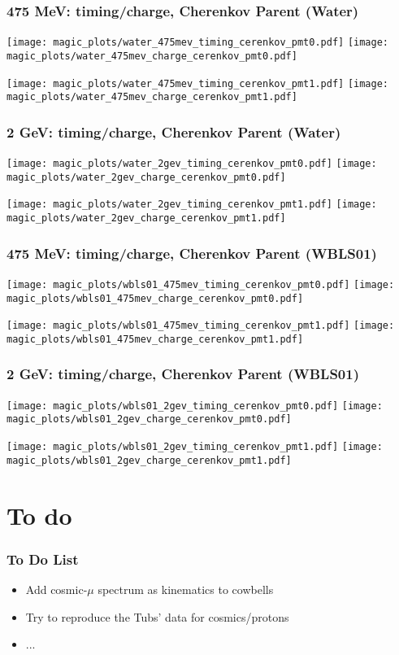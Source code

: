 \documentclass[xcolor=dvipsnames]{beamer}
\begin{document}
\begin{frame}[fragile]
  \frametitle{475 MeV: timing/charge, Cherenkov Parent (Water)}

\texttt{[image: magic\_plots/water\_475mev\_timing\_cerenkov\_pmt0.pdf]}%
\texttt{[image: magic\_plots/water\_475mev\_charge\_cerenkov\_pmt0.pdf]}%

\texttt{[image: magic\_plots/water\_475mev\_timing\_cerenkov\_pmt1.pdf]}%
\texttt{[image: magic\_plots/water\_475mev\_charge\_cerenkov\_pmt1.pdf]}%

\end{frame}
\begin{frame}[fragile]
  \frametitle{2 GeV: timing/charge, Cherenkov Parent (Water)}

\texttt{[image: magic\_plots/water\_2gev\_timing\_cerenkov\_pmt0.pdf]}%
\texttt{[image: magic\_plots/water\_2gev\_charge\_cerenkov\_pmt0.pdf]}%

\texttt{[image: magic\_plots/water\_2gev\_timing\_cerenkov\_pmt1.pdf]}%
\texttt{[image: magic\_plots/water\_2gev\_charge\_cerenkov\_pmt1.pdf]}%

\end{frame}

\begin{frame}[fragile]
  \frametitle{475 MeV: timing/charge, Cherenkov Parent (WBLS01)}

\texttt{[image: magic\_plots/wbls01\_475mev\_timing\_cerenkov\_pmt0.pdf]}%
\texttt{[image: magic\_plots/wbls01\_475mev\_charge\_cerenkov\_pmt0.pdf]}%

\texttt{[image: magic\_plots/wbls01\_475mev\_timing\_cerenkov\_pmt1.pdf]}%
\texttt{[image: magic\_plots/wbls01\_475mev\_charge\_cerenkov\_pmt1.pdf]}%

\end{frame}
\begin{frame}[fragile]
  \frametitle{2 GeV: timing/charge, Cherenkov Parent (WBLS01)}

\texttt{[image: magic\_plots/wbls01\_2gev\_timing\_cerenkov\_pmt0.pdf]}%
\texttt{[image: magic\_plots/wbls01\_2gev\_charge\_cerenkov\_pmt0.pdf]}%

\texttt{[image: magic\_plots/wbls01\_2gev\_timing\_cerenkov\_pmt1.pdf]}%
\texttt{[image: magic\_plots/wbls01\_2gev\_charge\_cerenkov\_pmt1.pdf]}%

\end{frame}


\section{To do}

\begin{frame}
  \frametitle{To Do List}
  \begin{itemize}
  \item Add cosmic-$\mu$ spectrum as kinematics to cowbells
  \item Try to reproduce the Tubs' data for cosmics/protons
  \item ...
  \end{itemize}
\end{frame}
\end{document}
